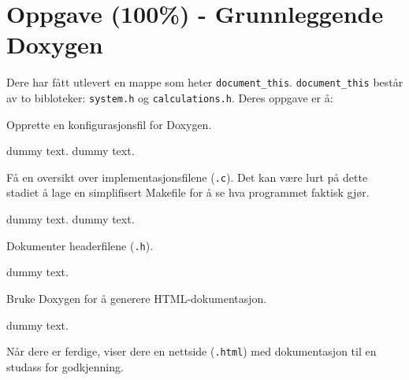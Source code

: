 \section{Oppgave (100\%) - Grunnleggende Doxygen}\label{sec:3-oppgave}

Dere har fått utlevert en mappe som heter \verb|document_this|. \verb|document_this| består av to bibloteker: \verb|system.h| og \verb|calculations.h|. Deres oppgave er å:

\begin{subprob}
    Opprette en konfigurasjonsfil for Doxygen.
	\begin{solution}
	    dummy text. dummy text. 
	\end{solution}
\end{subprob}

\begin{subprob}
    Få en oversikt over implementasjonsfilene (\verb|.c|). Det kan være lurt på dette stadiet å lage en simplifisert Makefile for å se hva programmet faktisk gjør.	\begin{solution}
        dummy text. dummy text. 
	\end{solution}
\end{subprob}

\begin{subprob}
    Dokumenter headerfilene (\verb|.h|).
	\begin{solution}
	    dummy text. 
	\end{solution}
\end{subprob}

\begin{subprob}
    Bruke Doxygen for å generere HTML-dokumentasjon.
	\begin{solution}
	    dummy text. 
	\end{solution}
\end{subprob}

Når dere er ferdige, viser dere en nettside (\verb|.html|) med dokumentasjon til en studass for godkjenning.